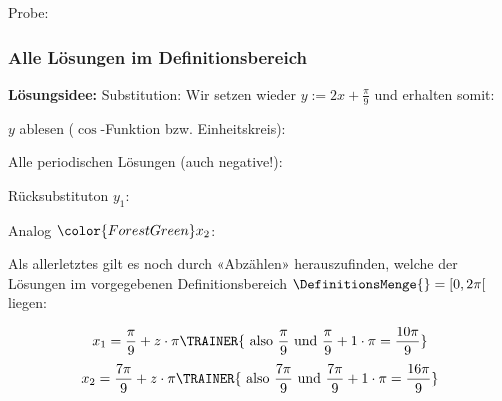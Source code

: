 Probe:

\subsubsection{Alle Lösungen im Definitionsbereich}
\textbf{Lösungsidee:} Substitution:
Wir setzen wieder $y := 2x + \frac{\pi}{9}$ und erhalten somit:



$y$ ablesen ($\cos$-Funktion bzw. Einheitskreis):




Alle periodischen Lösungen (auch negative!):



Rücksubstituton $y_1$:

Analog ${\color{ForestGreen}x_2}$:


Als allerletztes gilt es noch durch «Abzählen» herauszufinden, welche
der Lösungen im vorgegebenen Definitionsbereich $\DefinitionsMenge{} =
[0, 2\pi[$ liegen:

    $$x_1= \frac\pi9 + z\cdot{}\pi     \TRAINER{ \text{ also } \frac{\pi}{9} \text{ und } \frac{\pi}{9}+1\cdot{}\pi = \frac{10\pi}{9}}$$
    $$x_2= \frac{7\pi}9 + z\cdot{}\pi  \TRAINER{ \text{ also } \frac{7\pi}9  \text{ und } \frac{7\pi}9 +1\cdot{}\pi = \frac{16\pi}9}$$

      \vspace{5mm}

